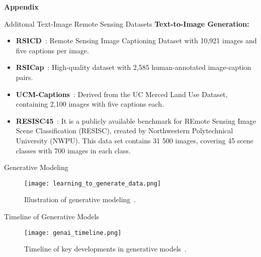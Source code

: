 \begin{refsection}
  \begin{frame}[plain]
    \vfill
    \centering
    {\Huge \textbf{Appendix}}
    \vfill
  \end{frame}
\end{refsection}

  \begin{refsection}
    \begin{frame}{Additonal Text-Image Remote Sensing Datasets}
      \textbf{Text-to-Image Generation:}
      \begin{itemize}
        \item \textbf{RSICD}~\parencite{lu2017exploring}: Remote Sensing Image Captioning Dataset with 10,921 images and five captions per image.
        \item \textbf{RSICap}~\parencite{hu2023rsgpt}: High-quality dataset with 2,585 human-annotated image-caption pairs.
        \item \textbf{UCM-Captions}~\parencite{qu2016deep}: Derived from the UC Merced Land Use Dataset, containing 2,100 images with five captions each.
        \item \textbf{RESISC45}~\parencite{Cheng2017}: It is a publicly available benchmark for REmote Sensing Image Scene Classification (RESISC), created by Northwestern Polytechnical University (NWPU). This data set contains 31 500 images, covering 45 scene classes with 700 images in each class.
      \end{itemize}
      \bottomleftrefs
    \end{frame}
  \end{refsection}

\begin{refsection}
  \begin{frame}{Generative Modeling}
    \begin{figure}
      \centering
      \texttt{[image: learning\_to\_generate\_data.png]}
      \caption{\scriptsize Illustration of generative modeling~\parencite{CVPR2023Tutorial}.}
    \end{figure}
    \bottomleftrefs
  \end{frame}
  \end{refsection}
  
  \begin{refsection}
  \begin{frame}{Timeline of Generative Models}
    \begin{figure}
      \centering
      \texttt{[image: genai\_timeline.png]}
      \caption{\scriptsize Timeline of key developments in generative models~\parencite{dengPPTAdvancedNueralNetwork2024}.}
    \end{figure}
    \bottomleftrefs
  \end{frame}
  \end{refsection}
  
